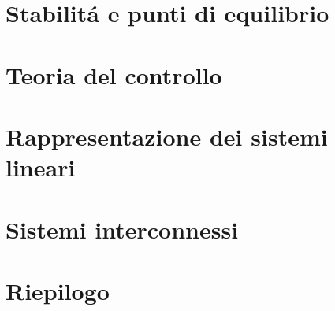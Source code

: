 \documentclass[openright]{report}
\begin{document}
	\chapter{Stabilit\'a e punti di equilibrio}
	\minitoc %
	\pagebreak
	
	\pagebreak
	\chapter{Teoria del controllo}
	\minitoc %
	\pagebreak
	
	
	
	
	
	
	\pagebreak
	\chapter{Rappresentazione dei sistemi lineari}
	\minitoc %
	\pagebreak
	
	
	
	\chapter{Sistemi interconnessi}
	\minitoc %
	\pagebreak
	
	\chapter{Riepilogo}
	\minitoc %
	\pagebreak
	
	
	
\end{document}
